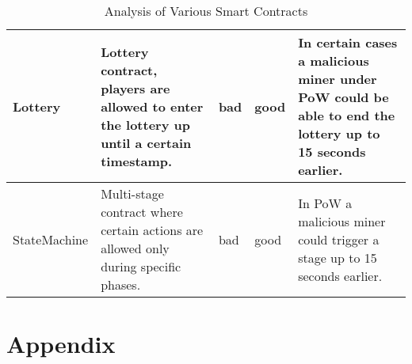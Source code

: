 \begin{table}[H]
\begin{tabularx}{\textwidth}{L{3.5cm}L{3.5cm}C{0.5cm}C{0.5cm}X}
    Lottery                & Lottery contract, players are allowed to enter the lottery up until a certain timestamp.                                                & bad          & good         & In certain cases a malicious miner under PoW could be able to end the lottery up to 15 seconds earlier.                                                                                       \\ \hline                  
    StateMachine           & Multi-stage contract where certain actions are allowed only during specific phases.                                                     & bad          & good         & In PoW a malicious miner could trigger a stage up to 15 seconds earlier.                                                                                                                     \\ \hline
  \end{tabularx}
  \caption{Analysis of Various Smart Contracts}
  \label{tab:smart_contracts}
\end{table}


\newpage
\section{Appendix}
\label{appendix}










